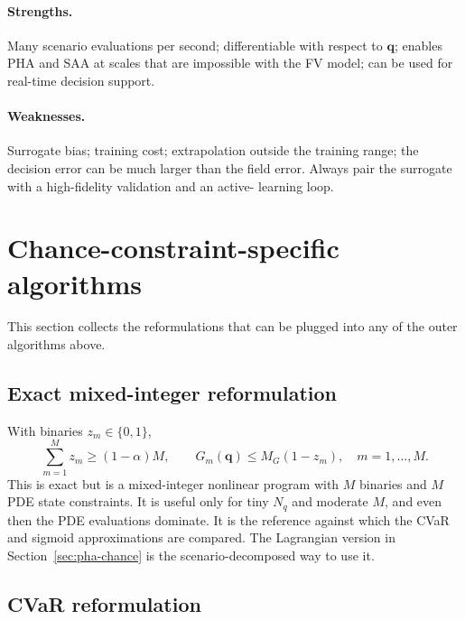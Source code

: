 \documentclass[11pt]{article}
\numberwithin{equation}{section}
\newcommand{\qq}{\mathbf{q}}
\theoremstyle{plain}
\begin{document}
\paragraph{Strengths.}  Many scenario evaluations per second; differentiable
with respect to $\qq$; enables PHA and SAA at scales that are impossible with
the FV model; can be used for real-time decision support.

\paragraph{Weaknesses.}  Surrogate bias; training cost; extrapolation outside
the training range; the decision error can be much larger than the field error.
Always pair the surrogate with a high-fidelity validation and an active-
learning loop.

\section{Chance-constraint-specific algorithms}
\label{sec:chance}

This section collects the reformulations that can be plugged into any of the
outer algorithms above.

\subsection{Exact mixed-integer reformulation}

With binaries $z_m\in\{0,1\}$,
\begin{equation}
\label{eq:minlp}
\sum_{m=1}^{M}z_m\ge(1-\alpha)M,
\qquad
G_m(\qq)\le M_G(1-z_m),\quad m=1,\dots,M.
\end{equation}
This is exact but is a mixed-integer nonlinear program with $M$ binaries and
$M$ PDE state constraints.  It is useful only for tiny $N_q$ and moderate $M$,
and even then the PDE evaluations dominate.  It is the reference against which
the CVaR and sigmoid approximations are compared.  The Lagrangian version in
Section~\ref{sec:pha-chance} is the scenario-decomposed way to use it.

\subsection{CVaR reformulation}
\end{document}
